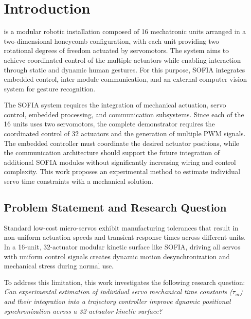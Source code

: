 \documentclass[lettersize,journal]{IEEEtran}
\begin{document}
	
	\section{Introduction}
	
	\label{sec:intro}
	
	 is a modular robotic installation composed of 16
	mechatronic units arranged in a two-dimensional honeycomb configuration, with each
	unit providing two rotational degrees of freedom actuated by servomotors. The
	system aims to achieve coordinated control of the multiple actuators while
	enabling interaction through static and dynamic human gestures. For this
	purpose, SOFIA integrates embedded control, inter-module communication, and an
	external computer vision system for gesture recognition.
	
	The SOFIA system requires the
	integration of mechanical actuation, servo control, embedded processing, and
	communication subsystems. Since each of the 16 units uses two servomotors, the
	complete demonstrator requires the coordinated control of 32 actuators and the
	generation of multiple PWM signals. The embedded controller must coordinate
	the desired actuator positions, while the communication architecture should
	support the future integration of additional SOFIA modules without
	significantly increasing wiring and control complexity. This work proposes an experimental method to estimate individual servo time constraints with a mechanical solution.
	
	\subsection{Problem Statement and Research Question}
	Standard low-cost micro-servos exhibit manufacturing tolerances that result in non-uniform actuation speeds and transient response times across different units. In a 16-unit, 32-actuator modular kinetic surface like SOFIA, driving all servos with uniform control signals creates dynamic motion desynchronization and mechanical stress during normal use.
	
	To address this limitation, this work investigates the following research question: \textit{Can experimental estimation of individual servo mechanical time constants ($\tau_m$) and their integration into a trajectory controller improve dynamic positional synchronization across a 32-actuator kinetic surface?}
	
\end{document}
